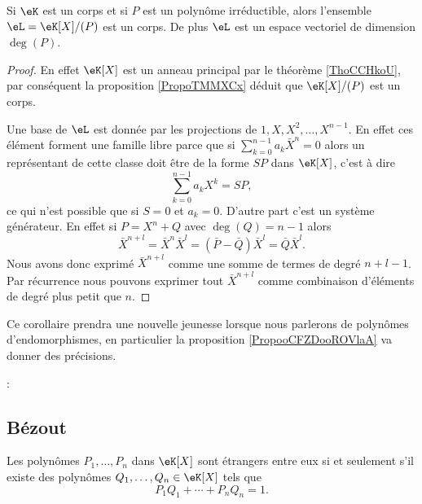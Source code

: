 \begin{corollary}       \label{CorsLGiEN}
    Si \( \eK\) est un corps et si \( P\) est un polynôme irréductible, alors l'ensemble \( \eL=\eK[X]/(P)\) est un corps. De plus \( \eL\) est un espace vectoriel de dimension \( \deg(P)\).
\end{corollary}

\begin{proof}
    En effet \( \eK[X]\) est un anneau principal par le théorème \ref{ThoCCHkoU}, par conséquent la proposition \ref{PropoTMMXCx} déduit que \( \eK[X]/(P)\) est un corps.

    Une base de \( \eL\) est donnée par les projections de \( 1,X,X^2,\ldots, X^{n-1}\). En effet ces élément forment une famille libre parce que si \( \sum_{k=0}^{n-1}a_k\bar X^n=0\) alors un représentant de cette classe doit être de la forme \( SP\) dans \( \eK[X]\), c'est à dire
    \begin{equation}
        \sum_{k=0}^{n-1}a_kX^k=SP,
    \end{equation}
    ce qui n'est possible que si \( S=0\) et \( a_k=0\). D'autre part c'est un système générateur. En effet si \( P=X^n+Q\) avec \( \deg(Q)=n-1\) alors
    \begin{equation}
        \bar X^{n+l}=\bar X^n\bar X^l=(\bar P-\bar Q)\bar X^l=\bar Q\bar X^l.
    \end{equation}
    Nous avons donc exprimé \( \bar X^{n+l}\) comme une somme de termes de degré \( n+l-1\). Par récurrence nous pouvons exprimer tout \( \bar X^{n+l}\) comme combinaison d'éléments de degré plus petit que \( n\).
\end{proof}

\begin{remark}
    Ce corollaire prendra une nouvelle jeunesse lorsque nous parlerons de polynômes d'endomorphismes, en particulier la proposition \ref{PropooCFZDooROVlaA} va donner des précisions.
\end{remark}
:
\subsection{Bézout}

\begin{theorem}[Bézout] \label{ThoBezoutOuGmLB}     
    Les polynômes \( P_1,\ldots,P_n\) dans \( \eK[X]\) sont étrangers entre eux si et seulement s'il existe des polynômes \( Q_1,\ldots,Q_n\in\eK[X]\) tels que
    \begin{equation}
        P_1Q_1+\cdots+P_nQ_n=1.
    \end{equation}
\end{theorem}


